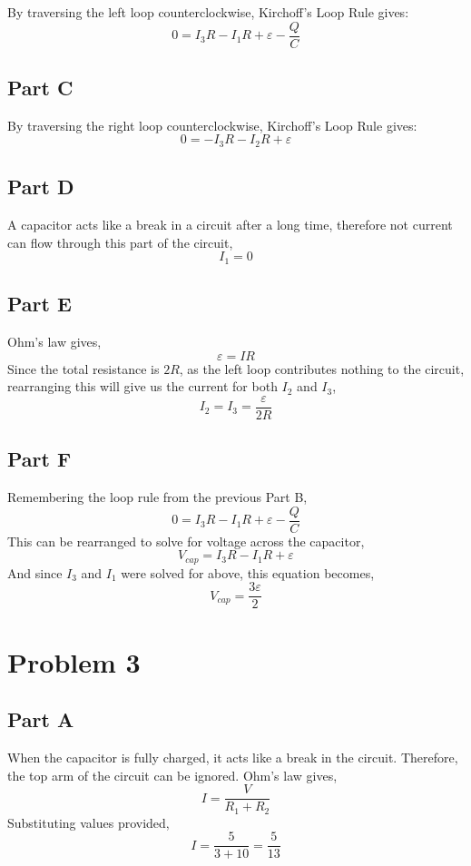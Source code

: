 \documentclass{article}
\begin{document}
By traversing the left loop counterclockwise, Kirchoff's Loop Rule gives:
$$ 0 = I_3 R - I_1 R + \varepsilon - \frac{Q}{C} $$

\subsection*{Part C}

By traversing the right loop counterclockwise, Kirchoff's Loop Rule gives:
$$ 0 = -I_3 R - I_2 R + \varepsilon $$

\subsection*{Part D}

A capacitor acts like a break in a circuit after a long time, therefore not
current can flow through this part of the circuit,
$$ I_1 = 0 $$

\subsection*{Part E}

Ohm's law gives,
$$ \varepsilon = I R $$
Since the total resistance is $2R$, as the left loop contributes nothing to the
circuit, rearranging this will give us the current for both $I_2$ and $I_3$,
$$ I_2 = I_3 = \frac{\varepsilon}{2R} $$

\subsection*{Part F}

Remembering the loop rule from the previous Part B,
$$ 0 = I_3 R - I_1 R + \varepsilon - \frac{Q}{C} $$
This can be rearranged to solve for voltage across the capacitor,
$$ V_{cap} = I_3 R - I_1 R + \varepsilon $$
And since $I_3$ and $I_1$ were solved for above, this equation becomes,
$$ V_{cap} = \frac{3 \varepsilon}{2} $$

\section*{Problem 3}

\subsection*{Part A}

When the capacitor is fully charged, it acts like a break in the circuit.
Therefore, the top arm of the circuit can be ignored. Ohm's law gives,
$$ I = \frac{V}{R_1 + R_2} $$
Substituting values provided,
$$ I = \frac{5}{3 + 10} = \frac{5}{13} $$
\end{document}
